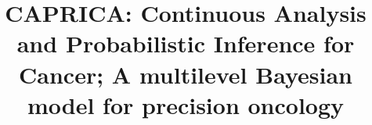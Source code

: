 \documentclass[twocolumn]{bmcart}%
\begin{document}
\begin{frontmatter}

\begin{fmbox}


\title{CAPRICA: Continuous Analysis and Probabilistic Inference for Cancer; A multilevel Bayesian model for precision oncology}


\author[
   addressref={aff1, aff2},
   corref={aff1},
   email={awasserman@xcures.com},
]{  }
\author[
   addressref={aff1},
   email={mshapiro@xcures.com}
]{  }
\author[
    addressref={aff1}
]{  }
\author[
   addressref={aff1, aff3},
   email={jshrager@xcures.com}
]{  }


\address[id=aff1]{
  ,
  ,                     
  ,
  ,
}

\address[id=aff2]{
  ,
  ,
  ,
  ,
}


\end{fmbox}
\end{frontmatter}
\end{document}
